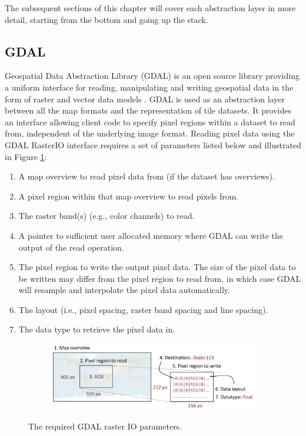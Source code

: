 The subsequent sections of this chapter will cover each abstraction layer in more detail, starting from the bottom and going up the stack.

\subsection{GDAL}
Geospatial Data Abstraction Library (GDAL) is an open source library providing a uniform interface for reading, manipulating and writing geospatial data in the form of raster and vector data models \cite{gdal}. GDAL is used as an abstraction layer between all the map formats and the representation of tile datasets. It provides an interface allowing client code to specify pixel regions within a dataset to read from, independent of the underlying image format. Reading pixel data using the GDAL RasterIO interface requires a set of parameters listed below and illustrated in Figure \ref{fig:gdalio}:

\begin{enumerate}
	\item A map overview to read pixel data from (if the dataset has overviews).
	\item A pixel region within that map overview to read pixels from.
	\item The raster band(s) (e.g., color channels) to read.
	\item A pointer to sufficient user allocated memory where GDAL can write the output of the read operation.
	\item The pixel region to write the output pixel data. The size of the pixel data to be written may differ from the pixel region to read from, in which case GDAL will resample and interpolate the pixel data automatically.
	\item The layout (i.e., pixel spacing, raster band spacing and line spacing).
	\item The data type to retrieve the pixel data in.
\end{enumerate}

\begin{figure}[htbp]
    \centering
    \begin{subfigure}[bt]{1.0\textwidth}
        \includegraphics[width=\textwidth]{figures/implementation/pipeline/gdalio.pdf}
    \end{subfigure}
    \caption{The required GDAL raster IO parameters.}
    \label{fig:gdalio}
\end{figure}

